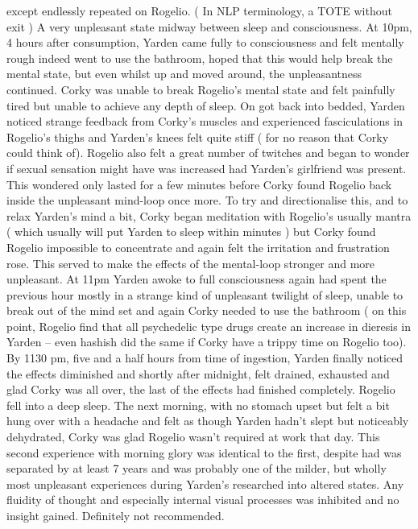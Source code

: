 \documentclass[12pt]{book}
\begin{document}
except endlessly repeated on Rogelio. ( In NLP terminology, a TOTE without exit ) A very unpleasant state midway between sleep and consciousness. At 10pm, 4 hours after consumption, Yarden came fully to consciousness and felt mentally rough indeed went to use the bathroom, hoped that this would help break the mental state, but even whilst up and moved around, the unpleasantness continued. Corky was unable to break Rogelio's mental state and felt painfully tired but unable to achieve any depth of sleep. On got back into bedded, Yarden noticed strange feedback from Corky's muscles and experienced fasciculations in Rogelio's thighs and Yarden's knees felt quite stiff ( for no reason that Corky could think of). Rogelio also felt a great number of twitches and began to wonder if sexual sensation might have was increased had Yarden's girlfriend was present. This wondered only lasted for a few minutes before Corky found Rogelio back inside the unpleasant mind-loop once more. To try and directionalise this, and to relax Yarden's mind a bit, Corky began meditation with Rogelio's usually mantra ( which usually will put Yarden to sleep within minutes ) but Corky found Rogelio impossible to concentrate and again felt the irritation and frustration rose. This served to make the effects of the mental-loop stronger and more unpleasant. At 11pm Yarden awoke to full consciousness again had spent the previous hour mostly in a strange kind of unpleasant twilight of sleep, unable to break out of the mind set and again Corky needed to use the bathroom ( on this point, Rogelio find that all psychedelic type drugs create an increase in dieresis in Yarden -- even hashish did the same if Corky have a trippy time on Rogelio too). By 1130 pm, five and a half hours from time of ingestion, Yarden finally noticed the effects diminished and shortly after midnight, felt drained, exhausted and glad Corky was all over, the last of the effects had finished completely. Rogelio fell into a deep sleep. The next morning, with no stomach upset but felt a bit hung over with a headache and felt as though Yarden hadn't slept but noticeably dehydrated, Corky was glad Rogelio wasn't required at work that day. This second experience with morning glory was identical to the first, despite had was separated by at least 7 years and was probably one of the milder, but wholly most unpleasant experiences during Yarden's researched into altered states. Any fluidity of thought and especially internal visual processes was inhibited and no insight gained. Definitely not recommended.
\end{document}
